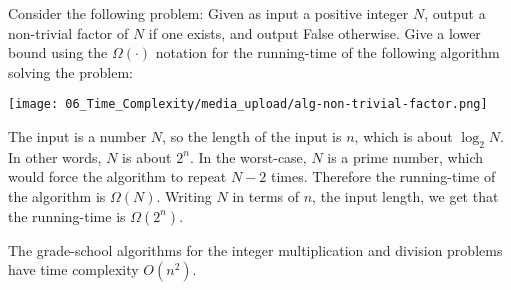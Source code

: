 \begin{flex}
\label{grp:exercise:Running-time-of-the-factoring-problem}

\begin{exercise}
\label{exercise:Running-time-of-the-factoring-problem}
Consider the following problem: Given as input a positive integer $N$, output a non-trivial factor of $N$ if one exists, and output False otherwise. Give a lower bound using the $\Omega(\cdot)$ notation for the running-time of the following algorithm solving the problem:

\begin{center}
\texttt{[image: 06\_Time\_Complexity/media\_upload/alg-non-trivial-factor.png]}
\end{center}

\end{exercise}

\begin{solution}
\label{sol:time-complexity::input}
The input is a number $N$, so the length of the input is $n$, which is about $\log_2 N$. In other words, $N$ is about $2^n$. In the worst-case, $N$ is a prime number, which would force the algorithm to repeat $N-2$ times. Therefore the running-time of the algorithm is $\Omega(N)$. Writing $N$ in terms of $n$, the input length, we get that the running-time is $\Omega(2^n)$.

\end{solution}
\end{flex}

\begin{note}
\label{note:Grade-school-algorithms-for-multiplication-and-division}
The grade-school algorithms for the integer multiplication and division problems have time complexity $O(n^2)$. 

\end{note}

